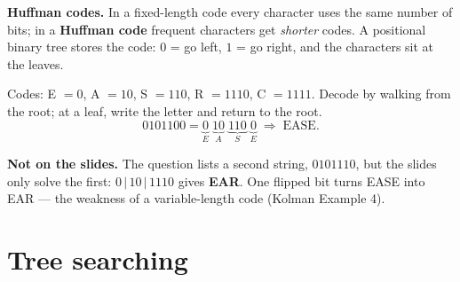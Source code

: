 \documentclass{fkt-notes}
\newcommand{\notslides}[1]{\par\noindent\textbf{Not on the slides.} #1\par}
\newcommand{\src}[1]{\par\noindent{\small\itshape Source: #1}\par\smallskip}
\newcommand{\kolman}[1]{\setcounter{section}{\numexpr#1-1\relax}}
\theoremstyle{definition}
\begin{document}
\textbf{Huffman codes.} In a fixed-length code every character uses the
same number of bits; in a \textbf{Huffman code} frequent characters get
\emph{shorter} codes. A positional binary tree stores the code: $0$ = go
left, $1$ = go right, and the characters sit at the leaves.

\begin{example}[7.2 Ex.~4: decoding]\leavevmode\par\noindent
  \begin{minipage}[c]{0.4\textwidth}
    \centering
  \end{minipage}\hfill
  \begin{minipage}[c]{0.56\textwidth}
    Codes: E $=0$, A $=10$, S $=110$, R $=1110$, C $=1111$. Decode by
    walking from the root; at a leaf, write the letter and return to the
    root.
    \[
      0101100=\underbrace{0}_{E}\;\underbrace{10}_{A}\;\underbrace{110}_{S}\;
      \underbrace{0}_{E}\;\Rightarrow\;\text{EASE}.
    \]
  \end{minipage}
  \notslides{The question lists a second string, $0101110$, but the slides
    only solve the first: $0\,|\,10\,|\,1110$ gives \textbf{EAR}. One
    flipped bit turns EASE into EAR --- the weakness of a variable-length
    code (Kolman Example 4).}
\end{example}

\kolman{3}
\section{Tree searching}\src{Kolman 7.3}
%
\end{document}

